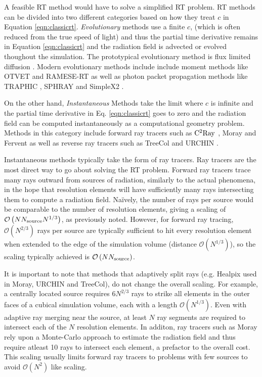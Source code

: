 \documentclass[fleq,usenatbib]{mnras}
\newcommand{\bigO}[1]{\mathcal{O}\left(#1\right)}
\newcommand{\NS}{N_{\rm source}}
\begin{document}
A feasible RT method would have to solve a simplified RT problem. RT methods 
can be divided into two different categories based on how they treat $c$ in 
Equation \ref{eqn:classicrt}. \textit{Evolutionary} methods use a finite $c$, 
(which is often reduced from the true speed of light) and thus the partial 
time derivative remains in Equation \ref{eqn:classicrt} and the radiation 
field is advected or evolved thoughout the simulation. The prototypical 
evolutionary method is flux limited diffusion \citep{levermorePomraning81}. 
Modern evolutionary methods include include moment methods like OTVET 
\citep{gnedinAbel01} and RAMESE-RT \citep{rosdahlTeyssier15} as well as photon 
packet propagation methods like TRAPHIC \citep{pawlikSchaye08}, SPHRAY 
\citep{altayEt08} and SimpleX2 \citep{paardekooperEt10}.

On the other hand, \textit{Instantaneous} Methods take the limit where $c$ is 
infinite and the partial time derivative in Eq. \ref{eqn:classicrt} goes to 
zero and the radiation field can be computed instantaneously as a 
computational geometry problem.  Methods in this category include forward ray 
tracers such as $\rm C^2Ray$ \citep{mellemaEt06a}, Moray \citep{wiseAbel11} 
and Fervent \citep{baczynskiEt15} as well as reverse ray tracers such as 
TreeCol \citep{clarkEt12} and URCHIN \citep{altayTheuns13}. 

Instantaneous methods typically take the form of ray tracers. Ray tracers are 
the most direct way to go about solving the RT problem. Forward ray tracers 
trace many rays outward from sources of radiation, similarly to the actual 
phenomena, in the hope that resolution elements will have sufficiently many 
rays intersecting them to compute a radiation field. Na\"ively, the number of 
rays per source would be comparable to the number of resolution elements, 
giving a scaling of $\bigO{N \NS N^{1/3}}$, as previously noted. However, for 
forward ray tracing, $\bigO{N^{2/3}}$ rays per source are typically sufficient 
to hit every resolution element when extended to the edge of the simulation 
volume (distance $\bigO{N^{1/3}}$), so the scaling typically achieved is 
$\bigO{N \NS}$.  

It is important to note that methods that adaptively split rays (e.g. Healpix 
\citep{gorskiEt05} used in Moray, URCHIN and TreeCol), do not change the 
overall scaling.  For example, a centrally located source requires $6 N^{2/3}$ 
rays to strike all elements in the outer faces of a cubical simulation volume, 
each with a length $\bigO{N^{1/3}}$. Even with adaptive ray merging near the 
source, at least $N$ ray segments are required to intersect each of the $N$ 
resolution elements. In additon, ray tracers such as Moray rely upon a 
Monte-Carlo approach to estimate the radiation field and thus require atleast 
10 rays to intersect each element, a prefactor to the overall cost. This 
scaling usually limits forward ray tracers to problems with few sources to 
avoid $\mathcal{O}(N^2)$ like scaling. 
\end{document}
